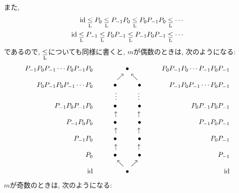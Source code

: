 また, 
\begin{align*}
  \operatorname{id} \mathrel{\underset{\text{L}}{\leq}}  P_0  \mathrel{\underset{\text{L}}{\leq}}  P_{-1}P_0 \mathrel{\underset{\text{L}}{\leq}}  P_0P_{-1}P_0 \mathrel{\underset{\text{L}}{\leq}} \cdots\\
  \operatorname{id} \mathrel{\underset{\text{L}}{\leq}}  P_{-1}  \mathrel{\underset{\text{L}}{\leq}}  P_0P_{-1} \mathrel{\underset{\text{L}}{\leq}}  P_{-1}P_0P_{-1} \mathrel{\underset{\text{L}}{\leq}} \cdots
\end{align*}
であるので, $\mathrel{\underset{\text{L}}{\leq}}$についても同様に書くと,
$m$が偶数のときは, 次のようになる:
\begin{align*}
  \begin{array}{crcccccrc}
    &P_{-1}P_0P_{-1}\cdots P_{0}P_{-1}P_0&&&\bullet&&&P_0P_{-1}P_{0}\cdots P_{-1}P_0P_{-1}\\
    &&&&\nearrow\phantom{\bullet}\nwarrow&\\
    &P_0P_{-1}P_0P_{-1}\cdots P_{0}&&&\bullet\phantom{\nearrow\bullet\nwarrow}\bullet&&&P_{-1}P_{0}P_{-1}\cdots P_0P_{-1}\\
    &&&&\vdots\phantom{\nearrow\bullet\swarrow}\vdots\\
    &P_{-1}P_0P_{-1}P_0&&&\bullet\phantom{\nearrow\bullet\nwarrow}\bullet&&&P_{0}P_{-1}P_{0}P_{-1}\\
    &&&&\uparrow\phantom{\nearrow\,\,\nwarrow}\uparrow&\\
    &P_{-1}P_0P_0&&&\bullet\phantom{\nearrow\bullet\nwarrow}\bullet&&&P_{-1}P_0P_{-1}\\
    &&&&\uparrow\phantom{\nearrow\,\,\nwarrow}\uparrow&\\
    &P_{-1}P_0&&&\bullet\phantom{\nearrow\bullet\nwarrow}\bullet&&&P_0P_{-1}\\
    &&&&\uparrow\phantom{\nearrow\,\,\nwarrow}\uparrow&\\
    &P_0&&&\bullet\phantom{\nearrow\bullet\nwarrow}\bullet&&&P_{-1}&\\
    &&&&\nwarrow\phantom{\bullet}\nearrow&\\
    &\operatorname{id} &&&\bullet &&&\operatorname{id}
  \end{array}
\end{align*}
$m$が奇数のときは, 次のようになる:
